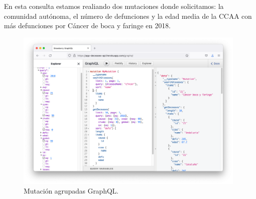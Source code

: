 En esta consulta estamos realiando dos mutaciones donde solicitamos: la comunidad autónoma,
el número de defunciones y la edad media de la CCAA con más defunciones por Cáncer de boca
y faringe en 2018.
\FloatBarrier
\begin{figure}[h]
	\centering
	\includegraphics[width=\textwidth]{doc/logos/imgs/ejemplo5.png}
	\caption{ Mutación agrupadas GraphQL. }
\end{figure}
\FloatBarrier
